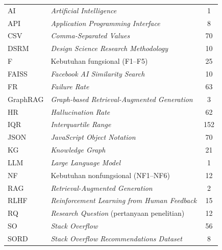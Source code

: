 \begin{longtable}{@{} l >{\raggedright\arraybackslash}p{7.5cm} c @{}}
AI       & \textit{Artificial Intelligence}                      & 1 \\
API      & \textit{Application Programming Interface}            & 8 \\
CSV      & \textit{Comma-Separated Values}                       & 70 \\
DSRM     & \textit{Design Science Research Methodology}          & 10 \\
F        & Kebutuhan fungsional (F1--F5)                         & 25 \\
FAISS    & \textit{Facebook AI Similarity Search}                & 10 \\
FR       & \textit{Failure Rate}                                 & 63 \\
GraphRAG & \textit{Graph-based Retrieval-Augmented Generation}   & 3 \\
HR       & \textit{Hallucination Rate}                           & 62 \\
IQR      & \textit{Interquartile Range}                          & 152 \\
JSON     & \textit{JavaScript Object Notation}                   & 70 \\
KG       & \textit{Knowledge Graph}                              & 21 \\
LLM      & \textit{Large Language Model}                         & 1 \\
NF       & Kebutuhan nonfungsional (NF1--NF6)                    & 12 \\
RAG      & \textit{Retrieval-Augmented Generation}               & 2 \\
RLHF     & \textit{Reinforcement Learning from Human Feedback}   & 15 \\
RQ       & \textit{Research Question} (pertanyaan penelitian)    & 12 \\
SO       & \textit{Stack Overflow}                               & 56 \\
SORD     & \textit{Stack Overflow Recommendations Dataset}       & 8 \\

\end{longtable}